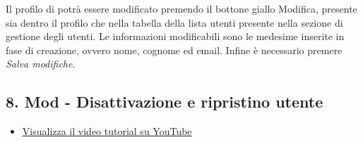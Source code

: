 	Il profilo di potrà essere modificato premendo il bottone giallo Modifica, presente sia dentro il profilo che nella tabella della lista utenti presente nella sezione di gestione degli utenti.
	Le informazioni modificabili sono le medesime inserite in fase di creazione, ovvero nome, cognome ed email.
	Infine è necessario premere \textit{Salva modifiche}.



\newpage \subsection{8. Mod - Disattivazione e ripristino utente}

	\begin{itemize}
		\item \href{https://www.youtube.com/watch?v=PjySMOLCtMA&list=PLPKYjnuIh1FA3b3jn_bwY_ztYzaFn2mIT&index=11}{Visualizza il video tutorial su YouTube} 
	\end{itemize}

